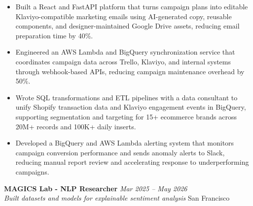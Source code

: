 \documentclass[a4paper,11pt]{article}
\newcommand{\resumeSubheading}[4]{%
\vspace{1mm}
\textbf{#1} \hfill \textit{\footnotesize #4} \\
\textit{\footnotesize #3} \hfill \footnotesize #2
\vspace{1mm}
}
\begin{document}
\vspace{-3mm}

\begin{itemize}[leftmargin=0.35in, itemsep=0.5mm]
\item Built a React and FastAPI platform that turns campaign plans into editable Klaviyo-compatible marketing emails using AI-generated copy, reusable components, and designer-maintained Google Drive assets, reducing email preparation time by 40\%.

\vspace{-.45mm}

\item Engineered an AWS Lambda and BigQuery synchronization service that coordinates campaign data across Trello, Klaviyo, and internal systems through webhook-based APIs, reducing campaign maintenance overhead by 50\%.

\vspace{-.45mm}

\item Wrote SQL transformations and ETL pipelines with a data consultant to unify Shopify transaction data and Klaviyo engagement events in BigQuery, supporting segmentation and targeting for 15+ ecommerce brands across 20M+ records and 100K+ daily inserts.
\vspace{-.45mm}

\item Developed a BigQuery and AWS Lambda alerting system that monitors campaign conversion performance and sends anomaly alerts to Slack, reducing manual report review and accelerating response to underperforming campaigns.

\end{itemize}

\vspace{-3mm}

\resumeSubheading
{MAGICS Lab - NLP Researcher}{San Francisco}
{Built datasets and models for explainable sentiment analysis}{Mar 2025 -- May 2026}
\vspace{-3mm}
\end{document}

